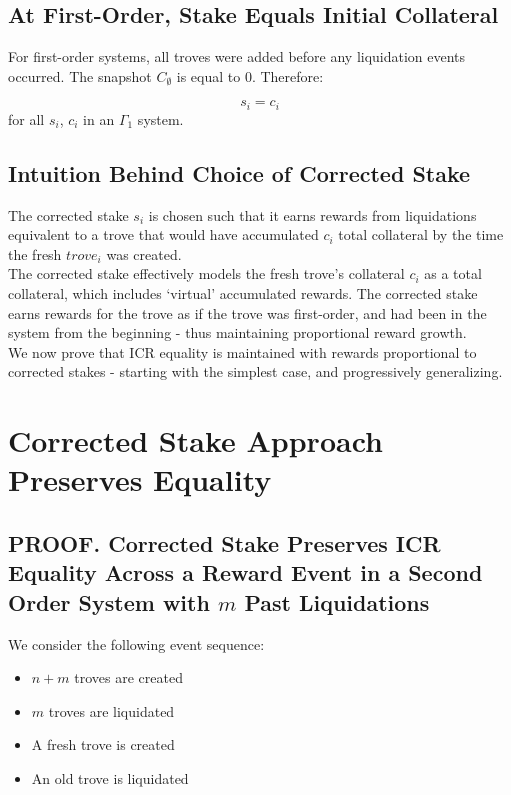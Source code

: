 \documentclass[reqno]{article}
\begin{document}
\subsection{At First-Order, Stake Equals Initial Collateral}

For first-order systems, all troves were added before any liquidation events occurred. The snapshot $C_\emptyset$ is equal to 0. Therefore:

\begin{equation} 
    s_i=c_i
\end{equation}
for all $s_i$, $c_i$ in an $\Gamma_1$ system.

\subsection{Intuition Behind Choice of Corrected Stake}

The corrected stake $s_i$ is chosen such that it earns rewards from liquidations equivalent to a trove that would have accumulated $c_i$ total collateral by the time the fresh $trove_i$ was created.\\

The corrected stake effectively models the fresh trove’s collateral $c_i$ as a total collateral, which includes ‘virtual’ accumulated rewards. The corrected stake earns rewards for the trove as if the trove was first-order, and had been in the system from the beginning - thus maintaining proportional reward growth.\\

We now prove that ICR equality is maintained with rewards proportional to corrected stakes - starting with the simplest case, and progressively generalizing.

\section{Corrected Stake Approach Preserves Equality}

\subsection{PROOF. Corrected Stake Preserves ICR Equality Across a Reward Event in a Second Order System with $m$ Past Liquidations}

We consider the following event sequence:

\begin{itemize}
  \item $n+m$ troves are created
  \item $m$ troves are liquidated
  \item A fresh trove is created
  \item An old trove is liquidated
\end{itemize}
\end{document}
